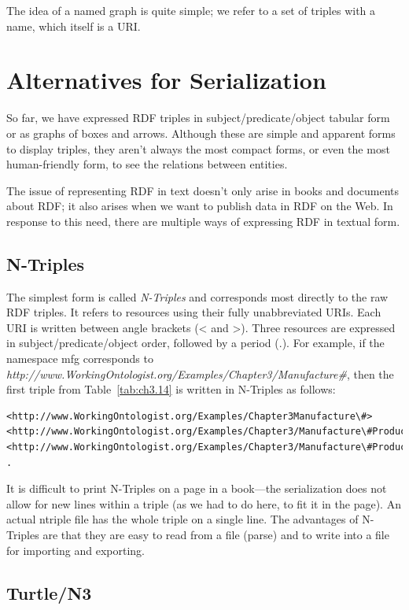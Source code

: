 The idea of a named graph is quite simple; we refer to a set of
triples with a name, which itself is a URI.  

\section{Alternatives for Serialization}
\label{serialization}
So far, we have expressed RDF triples in subject/predicate/object
tabular form or as graphs of boxes and arrows. Although these are simple
and apparent forms to display triples, they aren't always the most
compact forms, or even the most human-friendly form, to see the
relations between entities.

The issue of representing RDF in text doesn't only arise in books and
documents about RDF; it also arises when we want to publish data in RDF
on the Web. In response to this need, there are multiple ways of
expressing RDF in textual form.

\subsection{N-Triples}
\label{ntriples}

The simplest form is called \emph{N-Triples} and corresponds most directly to
the raw RDF triples. It refers to resources using their fully
unabbreviated URIs. Each URI is written between angle brackets
(\textless{} and \textgreater{}). Three resources are expressed in
subject/predicate/object order, followed by a period (.). For example,
if the namespace mfg corresponds to
\emph{http://www.WorkingOntologist.org/Examples/Chapter3/Manufacture\#}, then the first triple from Table~\ref{tab:ch3.14} is written
in N-Triples as follows:


\begin{lstlisting}
<http://www.WorkingOntologist.org/Examples/Chapter3Manufacture\#> <http://www.WorkingOntologist.org/Examples/Chapter3/Manufacture\#Product1> <http://www.WorkingOntologist.org/Examples/Chapter3/Manufacture\#Product> .
\end{lstlisting}

It is difficult to print N-Triples on a page in a book---the
serialization does not allow for new lines within a triple (as we had to
do here, to fit it in the page). An actual ntriple file has the whole
triple on a single line. The advantages of N-Triples are that they are
easy to read from a file (parse) and to write into a file for importing
and exporting.

\subsection{Turtle/N3}

